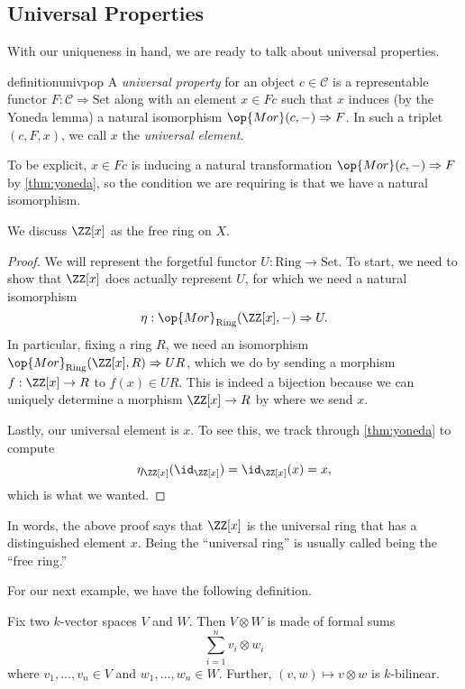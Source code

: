 \subsection{Universal Properties}
With our uniqueness in hand, we are ready to talk about universal properties.
\begin{restatable}{definition}{univpop}
	A \textit{universal property} for an object $c\in\mathcal C$ is a representable functor $F:\mathcal C\Rightarrow\mathrm{Set}$ along with an element $x\in Fc$ such that $x$ induces (by the Yoneda lemma) a natural isomorphism $\op{Mor}(c,-)\Rightarrow F$. In such a triplet $(c,F,x)$, we call $x$ the \textit{universal element}.
\end{restatable}
\noindent To be explicit, $x\in Fc$ is inducing a natural transformation $\op{Mor}(c,-)\Rightarrow F$ by \autoref{thm:yoneda}, so the condition we are requiring is that we have a natural isomorphism.
\begin{exe}
	We discuss $\ZZ[x]$ as the free ring on $X$.
\end{exe}
\begin{proof}
	We will represent the forgetful functor $U:\mathrm{Ring}\to\mathrm{Set}$. To start, we need to show that $\ZZ[x]$ does actually represent $U$, for which we need a natural isomorphism
	\[\eta:\op{Mor}_{\mathrm{Ring}}(\ZZ[x],-)\Rightarrow U.\]
	In particular, fixing a ring $R$, we need an isomorphism $\op{Mor}_{\mathrm{Ring}}(\ZZ[x],R)\Rightarrow UR$, which we do by sending a morphism $f:\ZZ[x]\to R$ to $f(x)\in UR$. This is indeed a bijection because we can uniquely determine a morphism $\ZZ[x]\to R$ by where we send $x$.
	
	Lastly, our universal element is $x$. To see this, we track through \autoref{thm:yoneda} to compute
	\[\eta_{\ZZ[x]}(\id_{\ZZ[x]})=\id_{\ZZ[x]}(x)=x,\]
	which is what we wanted.
\end{proof}
\begin{remark}
	In words, the above proof says that $\ZZ[x]$ is the universal ring that has a distinguished element $x$. Being the ``universal ring'' is usually called being the ``free ring.''
\end{remark}
For our next example, we have the following definition.
\begin{definition}
	Fix two $k$-vector spaces $V$ and $W$. Then $V\otimes W$ is made of formal sums
	\[\sum_{i=1}^nv_i\otimes w_i\]
	where $v_1,\ldots,v_n\in V$ and $w_1,\ldots,w_n\in W$. Further, $(v,w)\mapsto v\otimes w$ is $k$-bilinear.
\end{definition}
